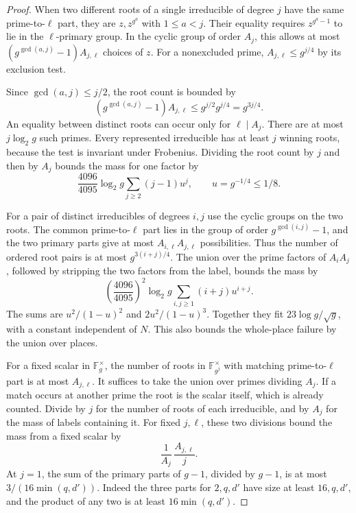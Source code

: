 \begin{proof}
When two different roots of a single irreducible of degree $j$
have the same prime-to-$\ell$ part, they are $z,z^{g^a}$ with
$1\le a<j$. Their equality requires $z^{g^a-1}$ to lie in the
$\ell$-primary group. In the cyclic group of order $A_j$, this
allows at most $(g^{\gcd(a,j)}-1)A_{j,\ell}$ choices of $z$.
For a nonexcluded prime, $A_{j,\ell}\le g^{j/4}$ by its
exclusion test.

Since \(\gcd(a,j)\le j/2\), the root count is bounded by
\[
  (g^{\gcd(a,j)}-1)A_{j,\ell}\le g^{j/2}g^{j/4}=g^{3j/4}.
\]
 An equality between distinct roots can occur only
for $\ell\mid A_j$. There are at most $j\log_2 g$ such primes.
Every represented irreducible has at least $j$ winning roots,
because the test is invariant under Frobenius. Dividing the root
count by $j$ and then by $A_j$ bounds the mass for one factor by
\[
 \frac{4096}{4095}\log_2 g
       \sum_{j\ge2}(j-1)u^j,
 \qquad u=g^{-1/4}\le1/8.
\]

For a pair of distinct irreducibles of degrees $i,j$ use the
cyclic groups on the two roots. The common prime-to-$\ell$
part lies in the group of order $g^{\gcd(i,j)}-1$, and the two
primary parts give at most $A_{i,\ell}A_{j,\ell}$ possibilities.
Thus the number of ordered root pairs is at most $g^{3(i+j)/4}$.
The union over the prime factors of $A_i A_j$, followed by
stripping the two factors from the label, bounds the mass by
\[
 \left(\frac{4096}{4095}\right)^2\log_2 g
                \sum_{i,j\ge1}(i+j)u^{i+j}.
\]
The sums are $u^2/(1-u)^2$ and $2u^2/(1-u)^3$. Together they
fit $23\log g/\sqrt g$, with a constant independent of $N$.
This also bounds the whole-place failure by the union over places.
\label{cor:paired-type-mass-1}

For a fixed scalar in $\mathbb F_g^\times$, the number of
roots in $\mathbb F_{g^j}^\times$ with matching prime-to-$\ell$
part is at most $A_{j,\ell}$. It suffices to take the union over
primes dividing $A_j$. If a match occurs at another prime the
root is the scalar itself, which is already counted. Divide by
$j$ for the number of roots of each irreducible, and by $A_j$
for the mass of labels containing it.
For fixed \(j,\ell\), these two divisions bound the mass from a fixed scalar by
\[
  \frac{1}{A_j}\,\frac{A_{j,\ell}}{j} .
\]
 At $j=1$, the sum of the
primary parts of $g-1$, divided by $g-1$, is at most
$3/(16\min(q,d'))$. Indeed the three parts for $2,q,d'$ have
size at least $16,q,d'$, and the product of any two is at least
$16\min(q,d')$.


\end{proof}
